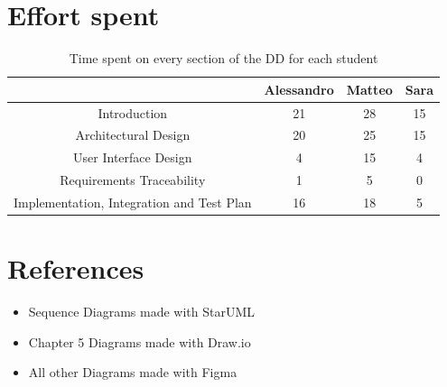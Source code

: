 \documentclass[12pt,a4paper]{article}
\begin{document}
\section{Effort spent}
\begin{table}[h]
  \centering
  \begin{tabular}{|c|c|c|c|}
    \hline
      & Alessandro & Matteo & Sara \\
    \hline
    Introduction & 21 & 28 & 15 \\
    \hline
    Architectural Design & 20 & 25 & 15 \\
    \hline
    User Interface Design & 4 & 15 & 4 \\ 
    \hline
    Requirements Traceability & 1 & 5 & 0  \\
    \hline
    Implementation, Integration and Test Plan & 16 & 18 & 5 \\
    \hline
    
  \end{tabular}
  \caption{Time spent on every section of the DD for each student}
  \label{tab:effort}
\end{table}

\section{References}
\begin{itemize}
  \item Sequence Diagrams made with StarUML
  \item Chapter 5 Diagrams made with Draw.io
  \item All other Diagrams made with Figma
\end{itemize}
%
%
\end{document}
